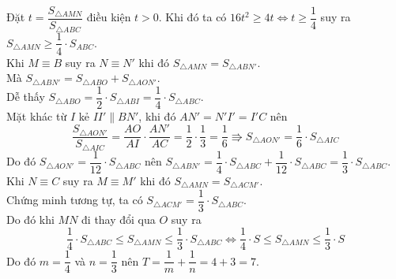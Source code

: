\begin{bt}
{			Đặt $t = \dfrac{S_{\triangle AMN}}{S_{\triangle ABC}}$ điều kiện $t > 0$. Khi đó ta có  $16t^2\geq 4t\Leftrightarrow t\geq\dfrac{1}{4}$ suy ra $S_{\triangle AMN}\geq \dfrac{1}{4}\cdot S_{ABC}$.\\
			Khi $M\equiv B$ suy ra $N\equiv N'$ khi đó $S_{\triangle AMN} =  S_{\triangle ABN'}$.\\
			Mà $S_{\triangle ABN'} = S_{\triangle ABO}+ S_{\triangle AON'}$.\\
			Dễ thấy $S_{\triangle ABO} = \dfrac{1}{2}\cdot S_{\triangle ABI} = \dfrac{1}{4}\cdot S_{\triangle ABC}$.\\
			Mặt khác từ $I$ kẻ $II'\parallel BN'$, khi đó $AN' = N'I' = I'C$ nên
			$$\dfrac{S_{\triangle AON'}}{S_{\triangle AIC}} = \dfrac{AO}{AI}\cdot\dfrac{AN'}{AC} = \dfrac{1}{2}\cdot\dfrac{1}{3} = \dfrac{1}{6}\Rrightarrow S_{\triangle AON'} = \dfrac{1}{6}\cdot S_{\triangle AIC}$$
			Do đó $S_{\triangle AON'} = \dfrac{1}{12}\cdot S_{\triangle ABC}$ nên $S_{\triangle ABN'} = \dfrac{1}{4}\cdot S_{\triangle ABC} + \dfrac{1}{12}\cdot S_{\triangle ABC} = \dfrac{1}{3}\cdot S_{\triangle ABC}$.\\
			Khi $N\equiv C$ suy ra $M\equiv M'$ khi đó $S_{\triangle AMN} =  S_{\triangle ACM'}$.\\
			Chứng minh tương tự, ta có  $S_{\triangle ACM'} = \dfrac{1}{3}\cdot S_{\triangle ABC}$.\\
			Do đó khi $MN$ đi thay đổi qua $O$ suy ra 
			$$\dfrac{1}{4}\cdot S_{\triangle ABC}\leq  S_{\triangle AMN}\leq  \dfrac{1}{3}\cdot S_{\triangle ABC}\Leftrightarrow \dfrac{1}{4}\cdot S\leq S_{\triangle AMN} \leq  \dfrac{1}{3}\cdot S$$
			Do đó $m = \dfrac{1}{4}$ và $n = \dfrac{1}{3}$ nên $T = \dfrac{1}{m} + \dfrac{1}{n} = 4 + 3 = 7$.
		}
	\end{bt}
